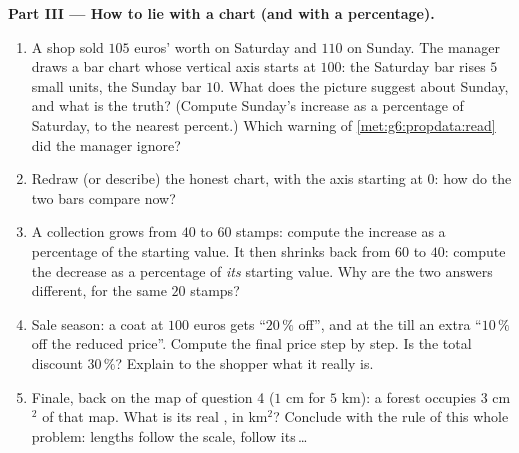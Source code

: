 \begin{problem}
\medskip
\noindent\textbf{Part III --- How to lie with a chart (and with
a percentage).}
\begin{enumerate}[resume]
  \item A shop sold $105$ euros' worth on Saturday and $110$ on
        Sunday. The manager draws a bar chart whose vertical
        axis starts at $100$: the Saturday bar rises $5$ small
        units, the Sunday bar $10$. What does the picture
        suggest about Sunday, and what is the truth? (Compute
        Sunday's increase as a percentage of Saturday, to the
        nearest percent.) Which warning of
        \cref{met:g6:propdata:read} did the manager ignore?
  \item Redraw (or describe) the honest chart, with the axis
        starting at $0$: how do the two bars compare now?
  \item A collection grows from $40$ to $60$ stamps: compute the
        increase as a percentage of the starting value. It then
        shrinks back from $60$ to $40$: compute the decrease as
        a percentage of \emph{its} starting value. Why are the
        two answers different, for the same $20$ stamps?
  \item Sale season: a coat at $100$ euros gets ``$20\,\%$
        off'', and at the till an extra ``$10\,\%$ off the
        reduced price''. Compute the final price step by step.
        Is the total discount $30\,\%$? Explain to the shopper
        what it really is.
  \item Finale, back on the map of question 4 ($1$ cm for
        $5$ km): a forest occupies $3$ cm$^2$ of that map. What
        is its real , in km$^2$? Conclude with the rule of
        this whole problem: lengths follow the scale, 
        follow its\,\dots
\end{enumerate}
\end{problem}

